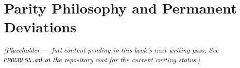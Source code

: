 \chapter{Parity Philosophy and Permanent Deviations}
\label{ch:parity-philosophy}

\emph{[Placeholder --- full content pending in this book's next writing pass. See \texttt{PROGRESS.md} at the repository root for the current writing status.]}
